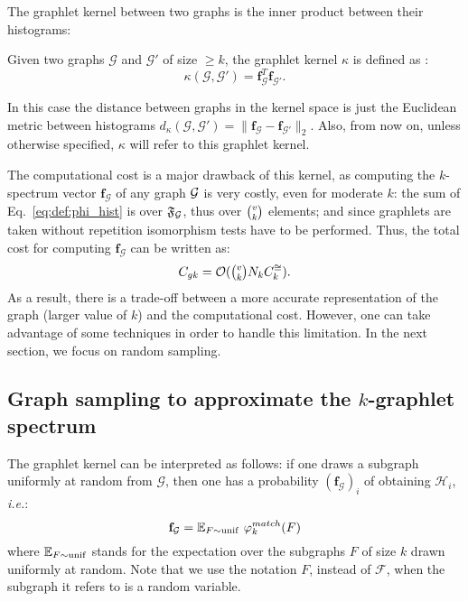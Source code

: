 The graphlet kernel between two graphs is the inner product between their histograms:
\begin{definition}
Given two graphs $\mathcal{G}$ and $\mathcal{G}'$ of size $\geq k$, the graphlet kernel $\kappa$ is defined as \citep{graphlet_kernel}:
\begin{equation}
\label{eq:graphlet_kernel}
    \kappa(\mathcal{G},\mathcal{G}')=\mathbf{f}_{\mathcal{G}}^T \mathbf{f}_{\mathcal{G}'}.
\end{equation}
\end{definition}
In this case the distance between graphs in the kernel space is just the Euclidean metric between histograms $d_\kappa({\mathcal{G}},{\mathcal{G}'}) = \|\mathbf{f}_{\mathcal{G}} - \mathbf{f}_{{\mathcal{G}'}}\|_2$. Also, from now on, unless otherwise specified, $\kappa$ will refer to this graphlet kernel. 

The computational cost is a major drawback of this kernel, as computing the $k$-spectrum vector $\mathbf{f}_{\mathcal{G}}$ of any graph $\mathcal{G}$ is very costly, even for moderate $k$: the sum of Eq.~\eqref{eq:def:phi_hist} is over $\mathfrak{F}_{\mathcal{G}}$, thus over $\tbinom{v}{k}$ elements; and since graphlets are taken without repetition isomorphism tests have to be performed. Thus, the total cost for computing $\mathbf{f}_{\mathcal{G}}$ can be written as:
\begin{equation}
\label{eq:cost_graphlet}
    C_{gk}= \mathcal{O}(\tbinom{v}{k} N_k C^{\cong}_k).
\end{equation}
As a result, there is a trade-off between a more accurate representation of the graph (larger value of $k$) and the computational cost. However, one can take advantage of some techniques in order to handle this limitation. In the next section, we focus on random sampling.

\subsection{Graph sampling to approximate the $k$-graphlet spectrum}
\label{graph_sampling}

The graphlet kernel can be interpreted as follows: if one draws a subgraph uniformly at random from $\mathcal{G}$, then one has a probability $(\mathbf{f}_\mathcal{G})_i$ of obtaining $\mathcal{H}_i$, \emph{i.e.}:
$$\mathbf{f}_\mathcal{G} = \mathbb{E}_{F \sim {\rm unif}} ~\varphi^{match}_k(F)$$
where $\mathbb{E}_{F \sim {\rm unif}}$ stands for the expectation over the subgraphs $F$ of size $k$ drawn uniformly at random. Note that we use the notation $F$, instead of $\mathcal{F}$, when the subgraph it refers to is a random variable. 

